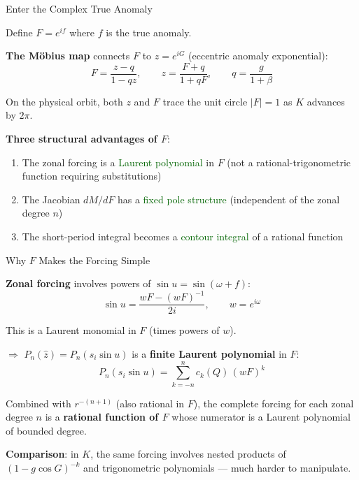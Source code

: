 \documentclass[aspectratio=169, 11pt]{beamer}
\newcommand{\good}[1]{\textcolor{darkgreen}{#1}}
\begin{document}
\begin{frame}{Enter the Complex True Anomaly}

Define $F = e^{if}$ where $f$ is the true anomaly.

\vspace{0.3em}
\textbf{The M\"obius map} connects $F$ to $z = e^{iG}$
(eccentric anomaly exponential):
\[
F = \frac{z - q}{1 - qz},
\qquad
z = \frac{F + q}{1 + qF},
\qquad
q = \frac{g}{1+\beta}
\]

\vspace{-0.3em}
On the physical orbit, both $z$ and $F$ trace the \alert{unit circle}
$|F| = 1$ as $K$ advances by $2\pi$.

\vspace{0.5em}
\textbf{Three structural advantages of $F$}:

\begin{enumerate}\setlength{\itemsep}{0.3em}
    \item The zonal forcing is a \good{Laurent polynomial} in $F$
          (not a rational-trigonometric function requiring substitutions)

    \item The Jacobian $dM/dF$ has a \good{fixed pole structure}
          (independent of the zonal degree $n$)

    \item The short-period integral becomes a \good{contour integral}
          of a rational function
\end{enumerate}

\end{frame}

\begin{frame}{Why $F$ Makes the Forcing Simple}

\textbf{Zonal forcing} involves powers of $\sin u = \sin(\omega + f)$:
\vspace{-0.2em}
\[
\sin u = \frac{wF - (wF)^{-1}}{2i},
\qquad w = e^{i\omega}
\]

\vspace{-0.4em}
This is a \alert{Laurent monomial} in $F$ (times powers of $w$).

\vspace{0.2em}
$\Rightarrow$ $P_n(\hat z) = P_n(s_i \sin u)$ is a
\textbf{finite Laurent polynomial} in $F$:
\vspace{-0.2em}
\[
P_n(s_i \sin u)
= \sum_{k=-n}^{n} c_k(Q)\, (wF)^k
\]

\vspace{-0.4em}
Combined with $r^{-(n+1)}$ (also rational in $F$), the complete forcing
for each zonal degree $n$ is a \textbf{rational function of $F$}
whose numerator is a Laurent polynomial of bounded degree.

\vspace{0.2em}
\textbf{Comparison}: in $K$, the same forcing involves
nested products of $(1 - g\cos G)^{-k}$ and trigonometric polynomials
--- much harder to manipulate.

\end{frame}
\end{document}
